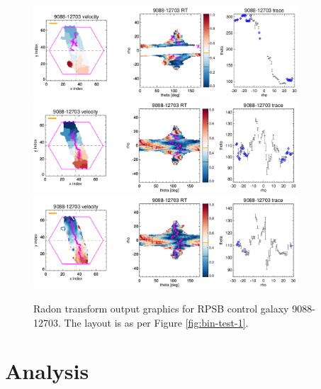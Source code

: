 \documentclass[fleqn,usenatbib]{mnras}
\begin{document}
\begin{figure}
    \centering
    \includegraphics[width=0.88\textwidth]{Images/bin-test/9088-12703-1-1-250-HYB10.png}
    \includegraphics[width=0.88\textwidth]{Images/bin-test/9088-12703-1-1-250-10-VOR10.png}
    \includegraphics[width=0.88\textwidth]{Images/bin-test/9088-12703-1-1-250-10-SPX.png}    
    \caption{Radon transform output graphics for RPSB control galaxy 9088-12703. The layout is as per Figure \ref{fig:bin-test-1}.}
    \label{fig:bin-test-4}
\end{figure}

\section{Analysis}
\label{sec:analysis}
\end{document}
